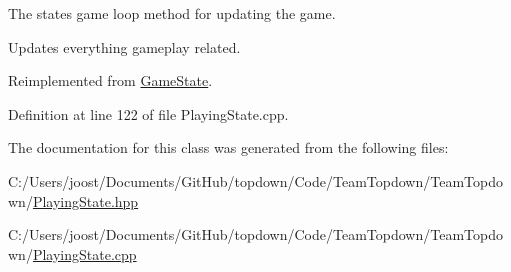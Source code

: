The state\textquotesingle{}s game loop method for updating the game. 

Updates everything gameplay related. 

Reimplemented from \hyperlink{class_game_state_a5be51b634f95bc6e57066ad6931aa18b}{Game\+State}.



Definition at line 122 of file Playing\+State.\+cpp.



The documentation for this class was generated from the following files\+:\begin{DoxyCompactItemize}
\item 
C\+:/\+Users/joost/\+Documents/\+Git\+Hub/topdown/\+Code/\+Team\+Topdown/\+Team\+Topdown/\hyperlink{_playing_state_8hpp}{Playing\+State.\+hpp}\item 
C\+:/\+Users/joost/\+Documents/\+Git\+Hub/topdown/\+Code/\+Team\+Topdown/\+Team\+Topdown/\hyperlink{_playing_state_8cpp}{Playing\+State.\+cpp}\end{DoxyCompactItemize}
